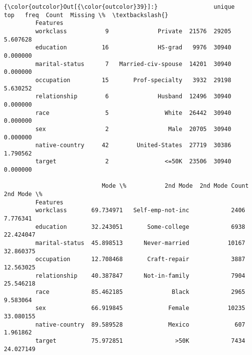 \documentclass[11pt]{article}
\begin{document}
\begin{Verbatim}[commandchars=\\\{\}]
{\color{outcolor}Out[{\color{outcolor}39}]:}                unique                  top   freq  Count  Missing \%  \textbackslash{}
         Features                                                              
         workclass           9              Private  21576  29205   5.607628   
         education          16              HS-grad   9976  30940   0.000000   
         marital-status      7   Married-civ-spouse  14201  30940   0.000000   
         occupation         15       Prof-specialty   3932  29198   5.630252   
         relationship        6              Husband  12496  30940   0.000000   
         race                5                White  26442  30940   0.000000   
         sex                 2                 Male  20705  30940   0.000000   
         native-country     42        United-States  27719  30386   1.790562   
         target              2                <=50K  23506  30940   0.000000   
         
                            Mode \%           2nd Mode  2nd Mode Count  2nd Mode \%  
         Features                                                                  
         workclass       69.734971   Self-emp-not-inc            2406    7.776341  
         education       32.243051       Some-college            6938   22.424047  
         marital-status  45.898513      Never-married           10167   32.860375  
         occupation      12.708468       Craft-repair            3887   12.563025  
         relationship    40.387847      Not-in-family            7904   25.546218  
         race            85.462185              Black            2965    9.583064  
         sex             66.919845             Female           10235   33.080155  
         native-country  89.589528             Mexico             607    1.961862  
         target          75.972851               >50K            7434   24.027149  
\end{Verbatim}
            
\end{document}
